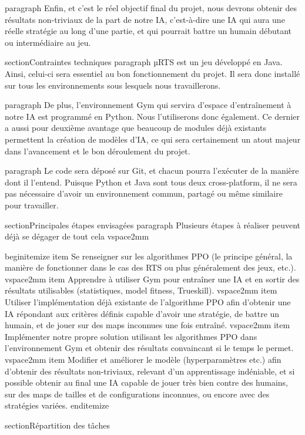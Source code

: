 	paragraph{}
	Enfin, et c'est le réel objectif final du projet, nous devrons obtenir des résultats non-triviaux de la part de notre IA, c'est-à-dire une IA qui aura une réelle stratégie au long d'une partie, et qui pourrait battre un humain débutant ou intermédiaire au jeu.
	
	
	section{Contraintes techniques}
	paragraph{}
	µRTS est un jeu développé en Java. Ainsi, celui-ci sera essentiel au bon fonctionnement du projet. Il sera donc installé sur tous les environnements sous lesquels nous travaillerons.
	
	paragraph{}
	De plus, l'environnement Gym qui servira d'espace d'entraînement à notre IA est programmé en Python. Nous l'utiliserons donc également. Ce dernier a aussi pour deuxième avantage que beaucoup de modules déjà existants permettent la création de modèles d'IA, ce qui sera certainement un atout majeur dans l'avancement et le bon déroulement du projet.
	
	paragraph{}
	Le code sera déposé sur Git, et chacun pourra l'exécuter de la manière dont il l'entend. Puisque Python et Java sont tous deux cross-platform, il ne sera pas nécessaire d'avoir un environnement commun, partagé ou même similaire pour travailler.
	
	
	section{Principales étapes envisagées}
	paragraph{}
	Plusieurs étapes à réaliser peuvent déjà se dégager de tout cela 
	vspace{2mm}
	
	begin{itemize}
		item Se renseigner sur les algorithmes PPO  (le principe général, la manière de fonctionner dans le cas des RTS ou plus généralement des jeux, etc.).
		vspace{2mm}
		item Apprendre à utiliser Gym pour entraîner une IA et en sortir des résultats utilisables (statistiques, model fitness, Trueskill).
		vspace{2mm}
		item Utiliser l'implémentation déjà existante de l'algorithme PPO afin d'obtenir une IA répondant aux critères définis capable d'avoir une stratégie, de battre un humain, et de jouer sur des maps inconnues une fois entraîné.
		vspace{2mm}
		item Implémenter notre propre solution utilisant les algorithmes PPO dans l'environnement Gym et obtenir des résultats convaincant si le temps le permet.
		vspace{2mm}
		item Modifier et améliorer le modèle (hyperparamètres etc.) afin d'obtenir des résultats non-triviaux, relevant d'un apprentissage indéniable, et si possible obtenir au final une IA capable de jouer très bien contre des humains, sur des maps de tailles et de configurations inconnues, ou encore avec des stratégies variées.
	end{itemize}
	
	section{Répartition des tâches}
	
